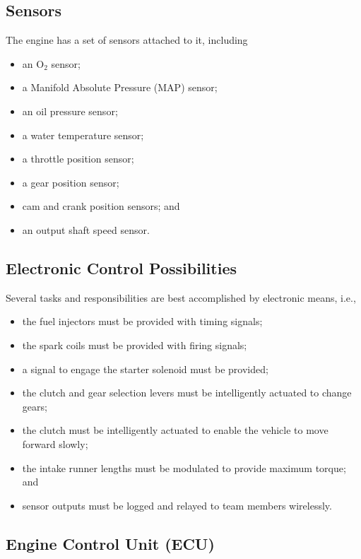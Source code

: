 \subsection{Sensors}

The engine has a set of sensors attached to it, including

\begin{itemize}
\item an O$_{2}$ sensor;
\item a Manifold Absolute Pressure (MAP) sensor; 
\item an oil pressure sensor;
\item a water temperature sensor;
\item a throttle position sensor;
\item a gear position sensor;
\item cam and crank position sensors; and
\item an output shaft speed sensor.
\end{itemize}

\subsection{Electronic Control Possibilities}

Several tasks and responsibilities are best accomplished by electronic means, i.e.,

\begin{itemize}
\item the fuel injectors must be provided with timing signals;
\item the spark coils must be provided with firing signals;
\item a signal to engage the starter solenoid must be provided;
\item the clutch and gear selection levers must be intelligently actuated to change gears; 
\item the clutch must be intelligently actuated to enable the vehicle to move forward slowly;
\item the intake runner lengths must be modulated to provide maximum torque; and
\item sensor outputs must be logged and relayed to team members wirelessly.
\end{itemize}

\subsection{Engine Control Unit (ECU)}

